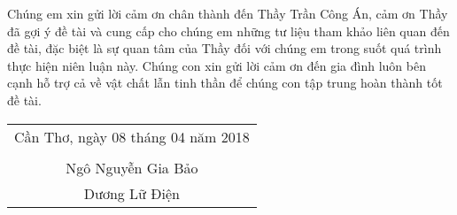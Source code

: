 \documentclass[./thesis.tex]{subfiles}
\begin{document}
Chúng em xin gửi lời cảm ơn chân thành đến Thầy Trần Công Án, cảm ơn Thầy đã gợi ý đề tài và cung cấp cho chúng em những tư liệu tham khảo liên quan đến đề tài, đặc biệt là sự quan tâm của Thầy đối với chúng em trong suốt quá trình thực hiện niên luận này. Chúng con xin gửi lời cảm ơn đến gia đình luôn bên cạnh hỗ trợ cả về vật chất lẫn tinh thần để chúng con tập trung hoàn thành tốt đề tài.


\hspace*{\fill}
\begin{tabular}{@{}c@{}} 

\\
Cần Thơ, ngày 08 tháng 04 năm 2018\\ \\
Ngô Nguyễn Gia Bảo\\
Dương Lữ Điện
\end{tabular}
\end{document}

